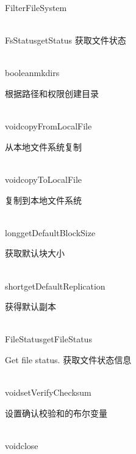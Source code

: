 \begin{XeClass}{FilterFileSystem}
\begin{XeMethod}{\XePublic\\ }{FsStatus}{getStatus}
 获取文件状态

  \end{XeMethod}

  \begin{XeMethod}{\XePublic\\ }{boolean}{mkdirs}
       
 根据路径和权限创建目录

  \end{XeMethod}

  \begin{XeMethod}{\XePublic\\ }{void}{copyFromLocalFile}
       
 从本地文件系统复制

  \end{XeMethod}

  \begin{XeMethod}{\XePublic\\ }{void}{copyToLocalFile}
       
 复制到本地文件系统

  \end{XeMethod}

  \begin{XeMethod}{\XePublic\\ }{long}{getDefaultBlockSize}
       
 获取默认块大小

  \end{XeMethod}

  \begin{XeMethod}{\XePublic\\ }{short}{getDefaultReplication}
       
 获得默认副本

  \end{XeMethod}

  \begin{XeMethod}{\XePublic\\ }{FileStatus}{getFileStatus}
       
 Get file status.
 获取文件状态信息

  \end{XeMethod}

  \begin{XeMethod}{\XePublic\\ }{void}{setVerifyChecksum}
       
 设置确认校验和的布尔变量

  \end{XeMethod}

  \begin{XeMethod}{\XePublic\\ }{void}{close}
       

\end{XeMethod}
\end{XeClass}
